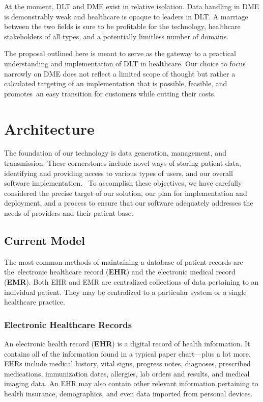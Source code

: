 \documentclass[letterpaper]{article}
\begin{document}
  At the moment, DLT and DME exist in relative isolation. Data handling in DME is demonstrably weak and healthcare is opaque to leaders in DLT. A marriage between the two fields is sure to be profitable for the technology, healthcare stakeholders of all types, and a potentially limitless number of domains.

  The proposal outlined here is meant to serve as the gateway to a practical understanding and implementation of DLT in healthcare. Our choice to focus narrowly on DME does not reflect a limited scope of thought but rather a calculated targeting of an implementation that is possible, feasible, and promotes an easy transition for customers while cutting their costs.
%
\section{Architecture}
The foundation of our technology is data generation, management, and transmission. These cornerstones include novel ways of storing patient data, identifying and providing access to various types of users, and our overall software implementation. 
%
To accomplish these objectives, we have carefully considered the precise target of our solution, our plan for implementation and deployment, and a process to ensure that our software adequately addresses the needs of providers and their patient base.
%
\subsection{Current Model}
The most common methods of maintaining a database of patient records are the electronic healthcare record (\textbf{EHR}) and the electronic medical record (\textbf{EMR}). Both EHR and EMR are centralized collections of data pertaining to an individual patient. They may be centralized to a particular system or a single healthcare practice.
%
  \subsubsection{Electronic Healthcare Records}
  An electronic health record (\textbf{EHR}) is a digital record of health information. It contains all of the information found in a typical paper chart---plus a lot more. EHRs include medical history, vital signs, progress notes, diagnoses, prescribed medications, immunization dates, allergies, lab orders and results, and medical imaging data. An EHR may also contain other relevant information pertaining to health insurance, demographics, and even data imported from personal devices.
%
\end{document}

